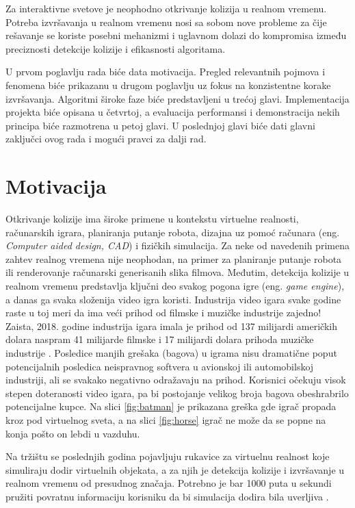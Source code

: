 \documentclass[12pt,oneside]{memoir}
\begin{document}
Za interaktivne svetove je neophodno otkrivanje kolizija u realnom vremenu. 
Potreba izvršavanja u realnom vremenu nosi sa sobom nove probleme za čije rešavanje se koriste posebni mehanizmi 
i uglavnom dolazi do kompromisa između preciznosti detekcije kolizije i efikasnosti algoritama.

U prvom poglavlju rada biće data motivacija. 
Pregled relevantnih pojmova i fenomena biće prikazanu u drugom poglavlju uz fokus na konzistentne korake izvršavanja.
Algoritmi široke faze biće predstavljeni u trećoj glavi. 
Implementacija projekta biće opisana u četvrtoj, 
a evaluacija performansi i demonstracija nekih principa biće razmotrena u petoj glavi.
U poslednjoj glavi biće dati glavni zaključci ovog rada i mogući pravci za dalji rad.

\section{Motivacija}
\label{sec:naslov1}
Otkrivanje kolizije ima široke primene u kontekstu virtuelne realnosti, računarskih igrara, planiranja putanje robota,
dizajna uz pomoć računara (eng. {\em Computer aided design, CAD}) i fizičkih simulacija. 
Za neke od navedenih primena zahtev realnog vremena nije neophodan, na primer za planiranje putanje robota ili renderovanje računarski generisanih slika filmova.
Međutim, detekcija kolizije u realnom vremenu predstavlja ključni deo svakog pogona igre (eng. {\em game engine}), a danas ga svaka složenija
video igra koristi. Industrija video igara svake godine raste \cite{game_industry}
u toj meri da ima veći prihod od filmske i muzičke industrije zajedno! Zaista, 2018. godine industrija igara imala je prihod od
137 milijardi američkih dolara naspram 41 milijarde filmske i 17 milijardi dolara prihoda muzičke industrije \cite{movie, music, game_industry}.
Posledice manjih grešaka (bagova) u igrama nisu dramatične poput potencijalnih posledica neispravnog softvera u avionskoj ili automobilskoj industriji, ali 
se svakako negativno odražavaju na prihod.
Korisnici očekuju visok stepen doteranosti video igara, pa bi postojanje velikog broja bagova 
obeshrabrilo potencijalne kupce. Na slici \ref{fig:batman} je prikazana greška gde igrač propada kroz
pod virtuelnog sveta, a na slici \ref{fig:horse} igrač ne može da se popne na konja pošto on lebdi u vazduhu.

Na tržištu se poslednjih godina pojavljuju rukavice za virtuelnu realnost koje simuliraju dodir virtuelnih objekata, a za njih je 
detekcija kolizije i izvršavanje u realnom vremenu od presudnog značaja.
Potrebno je bar 1000 puta u sekundi pružiti povratnu informaciju korisniku da bi simulacija dodira bila uverljiva \cite{haptic}. 
\end{document}
